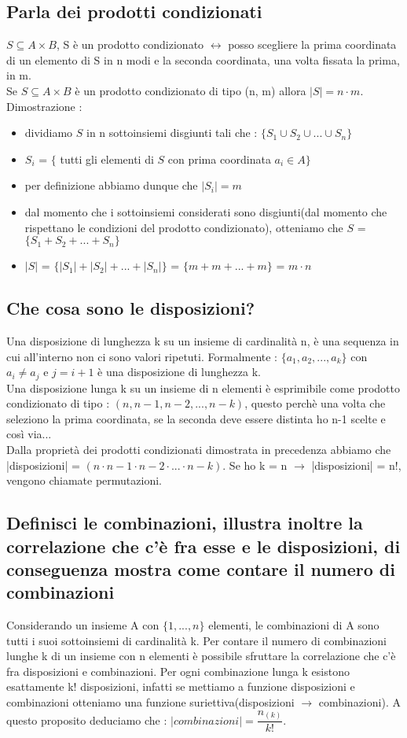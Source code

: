 \documentclass[a4paper,12pt]{report}
\begin{document}
	\subsection{Parla dei prodotti condizionati}
	$S \subseteq A \times B$, S è un prodotto condizionato $\leftrightarrow$ posso scegliere la prima coordinata di un elemento di S in n modi e la seconda coordinata, una volta fissata la prima, in m. \\
	Se $S \subseteq A \times B$ è un prodotto condizionato di tipo (n, m) allora $|S| = n \cdot m$. \\
	Dimostrazione : 
	\begin{itemize}
		\item dividiamo $S$ in n sottoinsiemi disgiunti tali che : $\{S_1 \cup S_2 \cup ... \cup S_n\}$
		\item $S_i$ = $\{$ tutti gli elementi di $S$ con prima coordinata $a_i \in A \}$
		\item per definizione abbiamo dunque che $|S_i| = m$
		\item dal momento che i sottoinsiemi considerati sono disgiunti(dal momento che rispettano le condizioni del prodotto condizionato), otteniamo che $S$ = $\{S_1 + S_2 + ... + S_n\}$
		\item $|S|$ = $\{|S_1| + |S_2| + ... + |S_n|\}$ = $\{ m + m + ... + m \}$ = $m \cdot n$
	\end{itemize}
	\subsection{Che cosa sono le disposizioni?}
	Una disposizione di lunghezza k su un insieme di cardinalità n, è una sequenza in cui all'interno non ci sono valori ripetuti. Formalmente : $\{a_1, a_2, ..., a_k\}$ con $a_i \neq a_j$ e $j = i + 1$ è una disposizione di lunghezza k. \\
	Una disposizione lunga k su un insieme di n elementi è esprimibile come prodotto condizionato di tipo : $(n, n-1, n-2, ..., n-k)$, questo perchè una volta che seleziono la prima coordinata, se la seconda deve essere distinta ho n-1 scelte e così via... \\
	Dalla proprietà dei prodotti condizionati dimostrata in precedenza abbiamo che |disposizioni| = $(n \cdot n-1 \cdot n - 2 \cdot ... \cdot n-k)$.
	Se ho k = n $\rightarrow$ |disposizioni| = n!, vengono chiamate permutazioni.
	\subsection{Definisci le combinazioni, illustra inoltre la correlazione che c'è fra esse e le disposizioni, di conseguenza mostra come contare il numero di combinazioni}
	Considerando un insieme A con $\{1, ..., n\}$ elementi, le combinazioni di A sono tutti i suoi sottoinsiemi di cardinalità k. Per contare il numero di combinazioni lunghe k di un insieme con n elementi è possibile sfruttare la correlazione che c'è fra disposizioni e combinazioni. Per ogni combinazione lunga k esistono esattamente k! disposizioni, infatti se mettiamo a funzione disposizioni e combinazioni otteniamo una funzione suriettiva(disposizioni $\rightarrow$ combinazioni). A questo proposito deduciamo che : $|combinazioni| = \dfrac{n_{(k)}}{k!}$.
\end{document}
